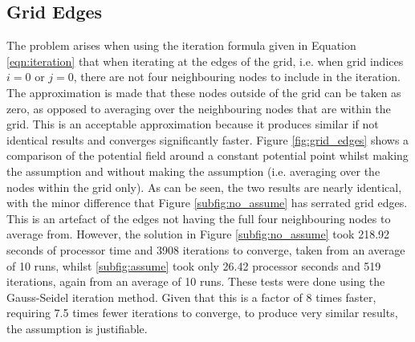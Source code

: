 \subsection{Grid Edges}
\label{subsec:grid_edges}

The problem arises when using the iteration formula given in Equation \ref{eqn:iteration} that when iterating at the edges of the grid, i.e. when grid indices $i=0$ or $j=0$, there are not four neighbouring nodes to include in the iteration. The approximation is made that these nodes outside of the grid can be taken as zero, as opposed to averaging over the neighbouring nodes that are within the grid. This is an acceptable approximation because it produces similar if not identical results and converges significantly faster. Figure \ref{fig:grid_edges} shows a comparison of the potential field around a constant potential point whilst making the assumption and without making the assumption (i.e. averaging over the nodes within the grid only). As can be seen, the two results are nearly identical, with the minor difference that Figure \ref{subfig:no_assume} has serrated grid edges. This is an artefact of the edges not having the full four neighbouring nodes to average from. However, the solution in Figure \ref{subfig:no_assume} took 218.92 seconds of processor time and 3908 iterations to converge, taken from an average of 10 runs, whilst \ref{subfig:assume} took only 26.42 processor seconds and 519 iterations, again from an average of 10 runs. These tests were done using the Gauss-Seidel iteration method. Given that this is a factor of 8 times faster, requiring 7.5 times fewer iterations to converge, to produce very similar results, the assumption is justifiable.

